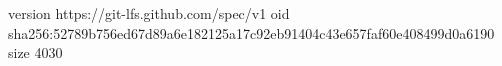 version https://git-lfs.github.com/spec/v1
oid sha256:52789b756ed67d89a6e182125a17c92eb91404c43e657faf60e408499d0a6190
size 4030

